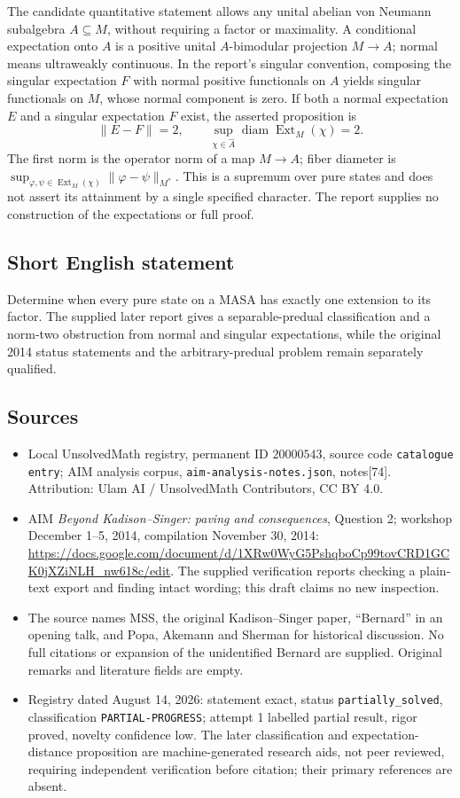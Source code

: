 \documentclass[11pt]{article}
\begin{document}
The candidate quantitative statement allows any unital abelian von Neumann subalgebra \(A\subseteq M\), without requiring a factor or maximality. A conditional expectation onto \(A\) is a positive unital \(A\)-bimodular projection \(M\to A\); normal means ultraweakly continuous. In the report's singular convention, composing the singular expectation \(F\) with normal positive functionals on \(A\) yields singular functionals on \(M\), whose normal component is zero. If both a normal expectation \(E\) and a singular expectation \(F\) exist, the asserted proposition is
\[
 \|E-F\|=2,\qquad
 \sup_{\chi\in\widehat A}\operatorname{diam}\operatorname{Ext}_M(\chi)=2.
\]
The first norm is the operator norm of a map \(M\to A\); fiber diameter is \(\sup_{\varphi,\psi\in\operatorname{Ext}_M(\chi)}\|\varphi-\psi\|_{M^*}\). This is a supremum over pure states and does not assert its attainment by a single specified character. The report supplies no construction of the expectations or full proof.
\subsection{Short English statement}
Determine when every pure state on a MASA has exactly one extension to its factor. The supplied later report gives a separable-predual classification and a norm-two obstruction from normal and singular expectations, while the original 2014 status statements and the arbitrary-predual problem remain separately qualified.
\subsection{Sources}
\begin{itemize}
\item Local UnsolvedMath registry, permanent ID \(20000543\), source code \texttt{catalogue entry}; AIM analysis corpus, \texttt{aim-analysis-notes.json}, notes[74]. Attribution: Ulam AI / UnsolvedMath Contributors, CC BY 4.0.
\item AIM \emph{Beyond Kadison--Singer: paving and consequences}, Question 2; workshop December 1--5, 2014, compilation November 30, 2014: \url{https://docs.google.com/document/d/1XRw0WyG5PshqboCp99tovCRD1GCK0jXZiNLH_nw618c/edit}. The supplied verification reports checking a plain-text export and finding intact wording; this draft claims no new inspection.
\item The source names MSS, the original Kadison--Singer paper, ``Bernard'' in an opening talk, and Popa, Akemann and Sherman for historical discussion. No full citations or expansion of the unidentified Bernard are supplied. Original remarks and literature fields are empty.
\item Registry dated August 14, 2026: statement exact, status \texttt{partially\_solved}, classification \texttt{PARTIAL-PROGRESS}; attempt 1 labelled partial result, rigor proved, novelty confidence low. The later classification and expectation-distance proposition are machine-generated research aids, not peer reviewed, requiring independent verification before citation; their primary references are absent.
\end{itemize}
\end{document}
